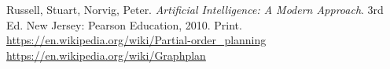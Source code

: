 \documentclass[10pt,a4paper]{article}
\begin{document}
\begin{thebibliography}{9}
    Russell, Stuart, Norvig, Peter. 
    \emph{Artificial Intelligence: A Modern Approach}.
    3rd Ed. New Jersey: Pearson Education, 2010. Print.
    \url{https://en.wikipedia.org/wiki/Partial-order_planning}
    \url{https://en.wikipedia.org/wiki/Graphplan}
\end{thebibliography}
\end{document}
